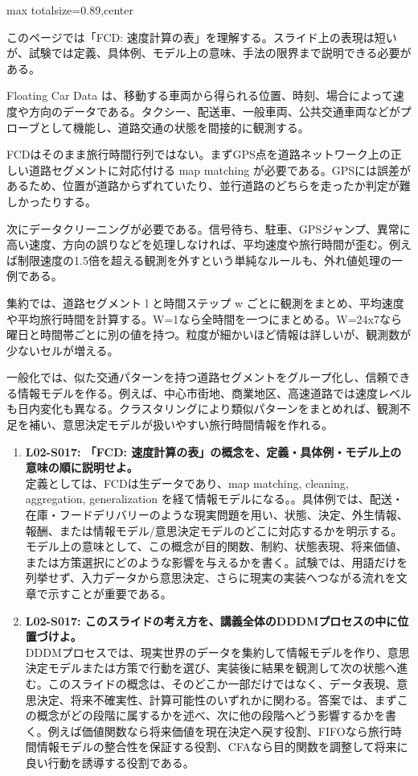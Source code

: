 \begin{minipage}[t]{0.58\textwidth}
\begin{adjustbox}{max totalsize={\textwidth}{0.89\textheight},center}
\begin{minipage}{\textwidth}\scriptsize
{}このページでは「FCD: 速度計算の表」を理解する。スライド上の表現は短いが、試験では定義、具体例、モデル上の意味、手法の限界まで説明できる必要がある。\par
Floating Car Data は、移動する車両から得られる位置、時刻、場合によって速度や方向のデータである。タクシー、配送車、一般車両、公共交通車両などがプローブとして機能し、道路交通の状態を間接的に観測する。\par
FCDはそのまま旅行時間行列ではない。まずGPS点を道路ネットワーク上の正しい道路セグメントに対応付ける map matching が必要である。GPSには誤差があるため、位置が道路からずれていたり、並行道路のどちらを走ったか判定が難しかったりする。\par
次にデータクリーニングが必要である。信号待ち、駐車、GPSジャンプ、異常に高い速度、方向の誤りなどを処理しなければ、平均速度や旅行時間が歪む。例えば制限速度の1.5倍を超える観測を外すという単純なルールも、外れ値処理の一例である。\par
集約では、道路セグメント l と時間ステップ w ごとに観測をまとめ、平均速度や平均旅行時間を計算する。W=1なら全時間を一つにまとめる。W=24x7なら曜日と時間帯ごとに別の値を持つ。粒度が細かいほど情報は詳しいが、観測数が少ないセルが増える。\par
一般化では、似た交通パターンを持つ道路セグメントをグループ化し、信頼できる情報モデルを作る。例えば、中心市街地、商業地区、高速道路では速度レベルも日内変化も異なる。クラスタリングにより類似パターンをまとめれば、観測不足を補い、意思決定モデルが扱いやすい旅行時間情報を作れる。\par{}\begin{enumerate}\item \textbf{L02-S017: 「FCD: 速度計算の表」の概念を、定義・具体例・モデル上の意味の順に説明せよ。}\\定義としては、FCDは生データであり、map matching, cleaning, aggregation, generalization を経て情報モデルになる。。具体例では、配送・在庫・フードデリバリーのような現実問題を用い、状態、決定、外生情報、報酬、または情報モデル/意思決定モデルのどこに対応するかを明示する。モデル上の意味として、この概念が目的関数、制約、状態表現、将来価値、または方策選択にどのような影響を与えるかを書く。試験では、用語だけを列挙せず、入力データから意思決定、さらに現実の実装へつながる流れを文章で示すことが重要である。\item \textbf{L02-S017: このスライドの考え方を、講義全体のDDDMプロセスの中に位置づけよ。}\\DDDMプロセスでは、現実世界のデータを集約して情報モデルを作り、意思決定モデルまたは方策で行動を選び、実装後に結果を観測して次の状態へ進む。このスライドの概念は、そのどこか一部だけではなく、データ表現、意思決定、将来不確実性、計算可能性のいずれかに関わる。答案では、まずこの概念がどの段階に属するかを述べ、次に他の段階へどう影響するかを書く。例えば価値関数なら将来価値を現在決定へ戻す役割、FIFOなら旅行時間情報モデルの整合性を保証する役割、CFAなら目的関数を調整して将来に良い行動を誘導する役割である。\end{enumerate}

\end{minipage}
\end{adjustbox}
\end{minipage}
